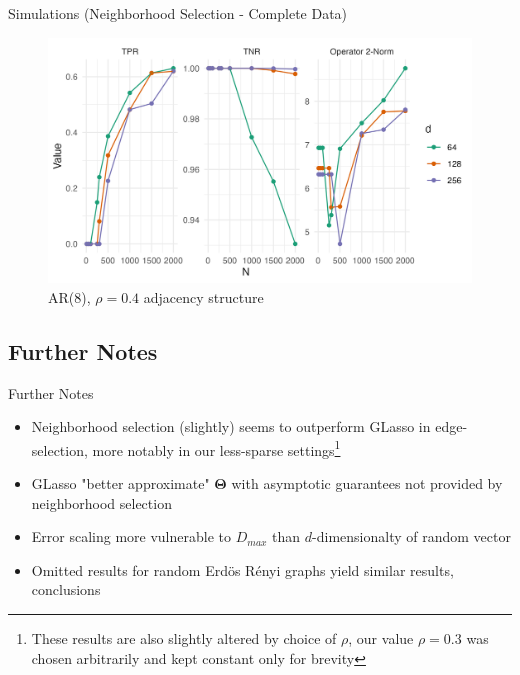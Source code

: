 \documentclass{beamer}
\begin{document}
\begin{frame}{Simulations (Neighborhood Selection - Complete Data)}
    \begin{figure}
        \centering 
        \includegraphics[scale=0.65]{glasso_complete_fixN_b8mb.png}
        \caption{AR(8), $\rho=0.4$ adjacency structure}
    \end{figure}
\end{frame}



\subsection{Further Notes}

\begin{frame}{Further Notes}
\begin{itemize}\setlength\itemsep{5mm}
    \item Neighborhood selection (slightly) seems to outperform GLasso in edge-selection, more notably in our less-sparse settings\footnote{These results are also slightly altered by choice of $\rho$, our value $\rho=0.3$ was chosen arbitrarily and kept constant only for brevity}
    \item GLasso "better approximate" $\boldsymbol\Theta$ with asymptotic guarantees not provided by neighborhood selection
    \item Error scaling more vulnerable to $D_{max}$ than $d$-dimensionalty of random vector 
    \item Omitted results for random Erd\"os R\'enyi graphs yield similar results, conclusions 
\end{itemize}    
\end{frame}
\end{document}
